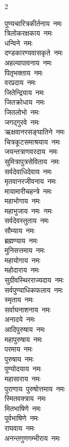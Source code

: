 \begin{multicols}{2}
\begin{flushleft}
पुण्यचारित्रकीर्तनाय~नमः\\
त्रिलोकरक्षकाय~नमः\\
धन्विने~नमः\\
दण्डकारण्यवासकृते~नमः\\
अहल्यापावनाय~नमः\\
पितृभक्ताय~नमः\\
वरप्रदाय~नमः\\
जितेन्द्रियाय~नमः\\
जितक्रोधाय~नमः\\
जितलोभो~नमः\hfill{}\\
जगद्गुरवे~नमः\\
ऋक्षवानरसङ्घातिने~नमः\\
चित्रकूटसमाश्रयाय~नमः\\
जयन्तत्राणवरदाय~नमः\\
सुमित्रापुत्रसेविताय~नमः\\
सर्वदेवाधिदेवाय~नमः\\
मृतवानरजीवनाय~नमः\\
मायामारीचहन्त्रे~नमः\\
महाभोगाय~नमः\\
महाभुजाय~नमः~नमः\hfill{}\\
सर्वदेवस्तुताय~नमः\\
सौम्याय~नमः\\
ब्रह्मण्याय~नमः\\
मुनिसत्तमाय~नमः\\
महायोगाय~नमः\\
महोदाराय~नमः\\
सुग्रीवस्थिरराज्यदाय~नमः\\
सर्वपुण्याधिकफलाय~नमः\\
स्मृताय~नमः\\
सर्वाघनाशनाय~नमः\hfill{}\\
अनादये~नमः\\
आदिपुरुषाय~नमः\\
महापुरुषाय~नमः\\
परमाय~नमः\\
पुरुषाय~नमः\\
पुण्योदयाय~नमः\\
महासाराय~नमः\\
पुराणाय~पुरुषोत्तमाय~नमः\\
स्मितवक्त्राय~नमः\\
मितभाषिणे~नमः\hfill{}\\
पूर्वभाषिणे~नमः\\
राघवाय~नमः\\
अनन्तगुणगम्भीराय~नमः\\

\end{flushleft}
\end{multicols}
